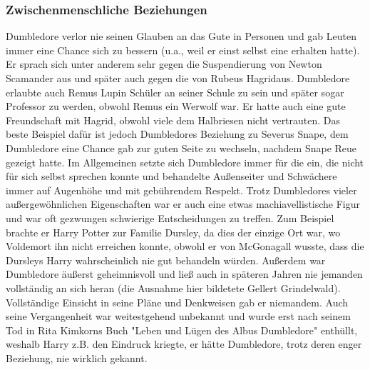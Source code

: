 \documentclass[a4paper, 10pt]{article}
\begin{document}
\subsubsection*{\large Zwischenmenschliche Beziehungen}
Dumbledore verlor nie seinen Glauben an das Gute in Personen und gab Leuten immer eine Chance sich zu bessern (u.a., weil er einst selbst eine erhalten hatte). Er sprach sich unter anderem sehr gegen die Suspendierung von Newton Scamander aus und später auch gegen die von Rubeus Hagridaus. Dumbledore erlaubte auch Remus Lupin Schüler an seiner Schule zu sein und später sogar Professor zu werden, obwohl Remus ein Werwolf war. Er hatte auch eine gute Freundschaft mit Hagrid, obwohl viele dem Halbriesen nicht vertrauten. Das beste Beispiel dafür ist jedoch Dumbledores Beziehung zu Severus Snape, dem Dumbledore eine Chance gab zur guten Seite zu wechseln, nachdem Snape Reue gezeigt hatte. Im Allgemeinen setzte sich Dumbledore immer für die ein, die nicht für sich selbst sprechen konnte und behandelte Außenseiter und Schwächere immer auf Augenhöhe und mit gebührendem Respekt.
\vspace{10pt}
\newline
{}  
Trotz Dumbledores vieler außergewöhnlichen Eigenschaften war er auch eine etwas machiavellistische Figur und war oft gezwungen schwierige Entscheidungen zu treffen. Zum Beispiel brachte er Harry Potter zur Familie Dursley, da dies der einzige Ort war, wo Voldemort ihn nicht erreichen konnte, obwohl er von McGonagall wusste, dass die Dursleys Harry wahrscheinlich nie gut behandeln würden.
\vspace{10pt}
\newline
{}  
Außerdem war Dumbledore äußerst geheimnisvoll und ließ auch in späteren Jahren nie jemanden vollständig an sich heran (die Ausnahme hier bildetete Gellert Grindelwald). Vollständige Einsicht in seine Pläne und Denkweisen gab er niemandem. Auch seine Vergangenheit war weitestgehend unbekannt und wurde erst nach seinem Tod in Rita Kimkorns Buch "Leben und Lügen des Albus Dumbledore" enthüllt, weshalb Harry z.B. den Eindruck kriegte, er hätte Dumbledore, trotz deren enger Beziehung, nie wirklich gekannt.
\end{document}

